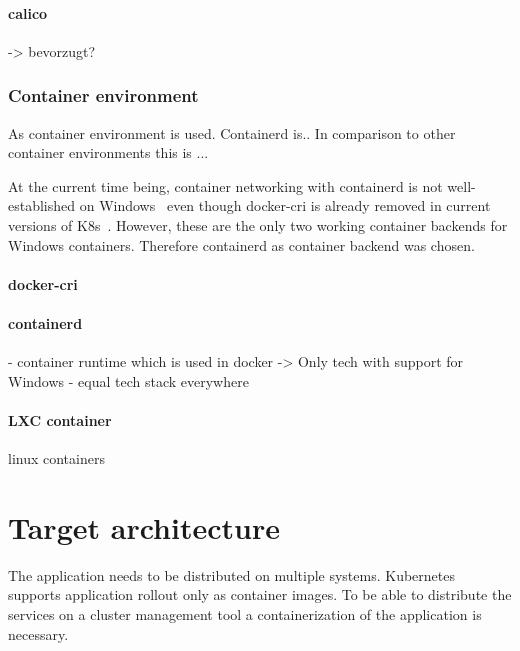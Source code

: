 \paragraph{calico}
-> bevorzugt?

\subsubsection{Container environment}
As container environment  is used. Containerd is..
In comparison to other container environments this is ...

At the current time being, container networking with containerd is not well-established on Windows~\cite{GitHub.20230202,GitHub.20230202b,Github.2022_258,GitHub.20230202c} even though docker-cri is already removed in current versions of \ac{K8s}~\cite{Kubernetes.2020}. However, these are the only two working container backends for Windows containers. Therefore containerd as container backend was chosen.

\paragraph{docker-cri}
\paragraph{containerd}
	- container runtime which is used in docker
	-> Only tech with support for Windows - equal tech stack everywhere
\paragraph{LXC container}
	linux containers






\section{Target architecture}
The application needs to be distributed on multiple systems. Kubernetes supports application rollout only as container images. To be able to distribute the services on a cluster management tool a containerization of the application is necessary.